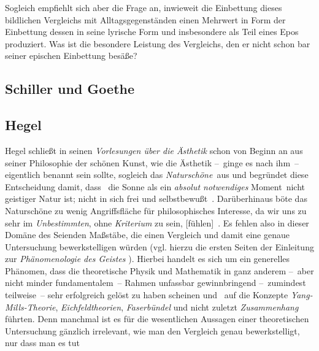 Sogleich empfiehlt sich aber die Frage an, inwieweit die Einbettung dieses
  bildlichen Vergleichs mit Alltagsgegenständen einen Mehrwert in Form der
  Einbettung dessen in seine lyrische Form und insbesondere als Teil eines
  Epos produziert.
Was ist die besondere Leistung des Vergleichs, den er nicht schon bar seiner
  epischen Einbettung besäße?

\subsection{Schiller und Goethe}
\subsection{Hegel}
Hegel schlie\ss t in seinen \emph{Vorlesungen über die Ästhetik}
  \citep{Hegel1986} schon von Beginn an aus seiner \glqq Philosophie der schönen Kunst\grqq,
   wie die Ästhetik --~ginge es nach ihm~-- eigentlich benannt sein sollte, \glqq
  sogleich das \emph{Naturschöne}\grqq\ aus \citep[S. 13]{Hegel1986} und begr\"{u}ndet
  diese Entscheidung damit, dass \zB\ die Sonne \glqq als ein \emph{absolut
  notwendiges} Moment\grqq\ nicht geistiger Natur ist; nicht \glqq in sich
  frei und selbstbewu\ss t\grqq\ \citep[S. 14]{Hegel1986}.
Dar\"{u}berhinaus böte das Naturschöne zu wenig Angriffsfläche für
  philosophisches Interesse, da wir \glqq uns zu sehr im \emph{Unbestimmten},
  ohne \emph{Kriterium} zu sein, [fühlen]\grqq\ \citep[S.15]{Hegel1986}.
Es fehlen also in dieser Domäne des Seienden Ma\ss stäbe, die einen Vergleich
  und damit eine genaue Untersuchung bewerkstelligen würden (vgl. hierzu die ersten
  Seiten der Einleitung zur \emph{Phänomenologie des Geistes} 
  \citep[S. ?? f.]{Hegel1987}).
Hierbei handelt es sich um ein generelles Phänomen, dass die theoretische
  Physik und Mathematik in ganz anderem --~aber nicht minder fundamentalem~-- Rahmen
  unfassbar gewinnbringend --~zumindest teilweise~-- sehr erfolgreich gelöst zu
  haben scheinen und \ua\ auf die Konzepte \emph{Yang-Mills-Theorie},
  \emph{Eichfeldtheorien}, \emph{Faserbündel} und nicht zuletzt \emph{Zusammenhang} führten.
Denn manchmal ist es für die wesentlichen Aussagen einer theoretischen Untersuchung gänzlich
  irrelevant, wie man den Vergleich genau bewerkstelligt, nur dass man es tut
